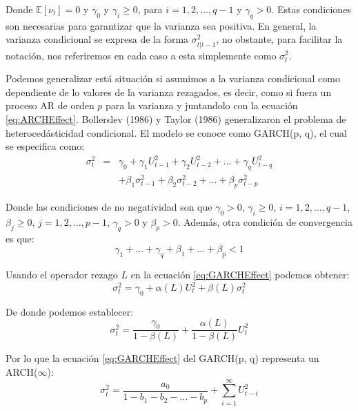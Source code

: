 \documentclass[
]{book}
\begin{document}
Donde \(\mathbb{E}[\nu_t] = 0\) y \(\gamma_0\) y \(\gamma_i \geq 0\), para \(i = 1, 2, \ldots, q-1\) y \(\gamma_q > 0\). Estas condiciones son necesarias para garantizar que la varianza sea positiva. En general, la varianza condicional se expresa de la forma \(\sigma^2_{t | t-1}\), no obstante, para facilitar la notación, nos referiremos en cada caso a esta simplemente como \(\sigma^2_{t}\).

Podemos generalizar está situación si asumimos a la varianza condicional como dependiente de lo valores de la varianza rezagados, es decir, como si fuera un proceso AR de orden \(p\) para la varianza y juntandolo con la ecuación \eqref{eq:ARCHEffect}. Bollerslev (1986) y Taylor (1986) generalizaron el problema de heterocedásticidad condicional. El modelo se conoce como GARCH(p, q), el cual se especifica como:
\begin{eqnarray}
    \sigma^2_t & = & \gamma_0 + \gamma_1 U_{t-1}^2 + \gamma_2 U_{t-2}^2 + \ldots + \gamma_q U_{t-q}^2 \\ \nonumber 
    & & + \beta_1 \sigma^2_{t-1} + \beta_2 \sigma^2_{t-2} + \ldots + \beta_p \sigma^2_{t-p}
    \label{eq:GARCHEffect}
\end{eqnarray}

Donde las condiciones de no negatividad son que \(\gamma_0 > 0\), \(\gamma_i \geq 0\), \(i = 1, 2, \ldots, q-1\), \(\beta_j \geq 0\), \(j = 1, 2, \ldots, p-1\), \(\gamma_q > 0\) y \(\beta_p > 0\). Además, otra condición de convergencia es que:
\begin{equation*}
    \gamma_1 + \ldots + \gamma_q + \beta_1 + \ldots + \beta_p < 1
\end{equation*}

Usando el operador rezago \(L\) en la ecuación \eqref{eq:GARCHEffect} podemos obtener:
\begin{equation}
    \sigma^2_t = \gamma_0 + \alpha(L) U_t^2 + \beta(L) \sigma^2_t
    \label{eq:GARCHEffectL}
\end{equation}

De donde podemos establecer:
\begin{equation}
    \sigma^2_t = \frac{\gamma_0}{1 - \beta(L)} + \frac{\alpha(L)}{1 - \beta(L)} U_t^2 
\end{equation}

Por lo que la ecuación \eqref{eq:GARCHEffect} del GARCH(p, q) representa un ARCH(\(\infty\)):
\begin{equation}
    \sigma^2_t = \frac{a_0}{1 - b_1 - b_2 - \ldots - b_p} + \sum_{i = 1}^\infty U_{t-i}^2 
\end{equation}
\end{document}
